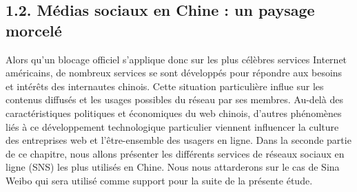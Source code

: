 \subsection*{1.2. M\'edias sociaux en Chine : un paysage morcel\'e }
\hypertarget{RefHeading91699228146}{}{\color{black}
Alors qu'un blocage officiel s'applique donc sur les plus c\'el\`ebres services Internet am\'ericains, de nombreux
services se sont d\'evelopp\'es pour r\'epondre aux besoins et int\'er\^ets des internautes chinois. Cette situation
particuli\`ere influe sur les contenus diffus\'es et les usages possibles du r\'eseau par ses membres. Au-del\`a des
caract\'eristiques politiques et \'economiques du web chinois, d'autres ph\'enom\`enes li\'es \`a ce d\'eveloppement
technologique particulier viennent influencer la culture des entreprises web et l'\^etre-ensemble des usagers en ligne.
Dans la seconde partie de ce chapitre, nous allons pr\'esenter les diff\'erents services de r\'eseaux sociaux en ligne
(SNS) les plus utilis\'es en Chine. Nous nous attarderons sur le cas de Sina Weibo qui sera utilis\'e comme support
pour la suite de la pr\'esente \'etude. }


\bigskip

